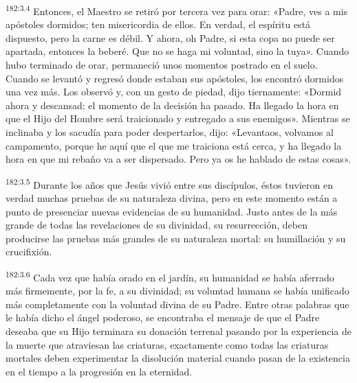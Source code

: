 \par 
\textsuperscript{182:3.4} Entonces, el Maestro se retiró por tercera vez para orar: «Padre, ves a mis apóstoles dormidos; ten misericordia de ellos. En verdad, el espíritu está dispuesto, pero la carne es débil. Y ahora, oh Padre, si esta copa no puede ser apartada, entonces la beberé. Que no se haga mi voluntad, sino la tuya». Cuando hubo terminado de orar, permaneció unos momentos postrado en el suelo. Cuando se levantó y regresó donde estaban sus apóstoles, los encontró dormidos una vez más. Los observó y, con un gesto de piedad, dijo tiernamente: «Dormid ahora y descansad; el momento de la decisión ha pasado. Ha llegado la hora en que el Hijo del Hombre será traicionado y entregado a sus enemigos». Mientras se inclinaba y los sacudía para poder despertarlos, dijo: «Levantaos, volvamos al campamento, porque he aquí que el que me traiciona está cerca, y ha llegado la hora en que mi rebaño va a ser dispersado. Pero ya os he hablado de estas cosas».

\par 
\textsuperscript{182:3.5} Durante los años que Jesús vivió entre sus discípulos, éstos tuvieron en verdad muchas pruebas de su naturaleza divina, pero en este momento están a punto de presenciar nuevas evidencias de su humanidad. Justo antes de la más grande de todas las revelaciones de su divinidad, su resurrección, deben producirse las pruebas más grandes de su naturaleza mortal: su humillación y su crucifixión.

\par 
\textsuperscript{182:3.6} Cada vez que había orado en el jardín, su humanidad se había aferrado más firmemente, por la fe, a su divinidad; su voluntad humana se había unificado más completamente con la voluntad divina de su Padre. Entre otras palabras que le había dicho el ángel poderoso, se encontraba el mensaje de que el Padre deseaba que su Hijo terminara su donación terrenal pasando por la experiencia de la muerte que atraviesan las criaturas, exactamente como todas las criaturas mortales deben experimentar la disolución material cuando pasan de la existencia en el tiempo a la progresión en la eternidad.

